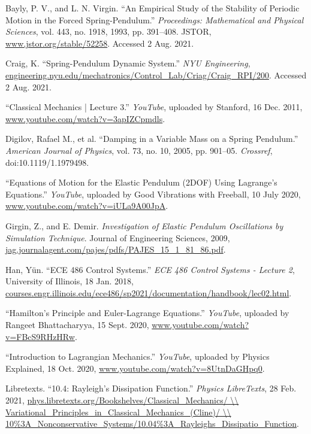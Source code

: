 

\renewcommand{\bibname}{{Bibliography}}

\begin{thebibliography}{99}

Bayly, P. V., and L. N. Virgin. “An Empirical Study of the Stability of Periodic Motion in the Forced Spring-Pendulum.” \emph{Proceedings: Mathematical and Physical Sciences}, vol. 443, no. 1918, 1993, pp. 391–408. JSTOR, \url{www.jstor.org/stable/52258}. Accessed 2 Aug. 2021.

Craig, K. “Spring-Pendulum Dynamic System.” \emph{NYU Engineering}, \url{engineering.nyu.edu/mechatronics/Control\_Lab/Criag/Craig\_RPI/200}. Accessed 2 Aug. 2021.

“Classical Mechanics | Lecture 3.” \emph{YouTube}, uploaded by Stanford, 16 Dec. 2011, \url{www.youtube.com/watch?v=3apIZCpmdls}.

Digilov, Rafael M., et al. “Damping in a Variable Mass on a Spring Pendulum.” \emph{American Journal of Physics}, vol. 73, no. 10, 2005, pp. 901–05. \emph{Crossref}, doi:10.1119/1.1979498.

“Equations of Motion for the Elastic Pendulum (2DOF) Using Lagrange’s Equations.” \emph{YouTube}, uploaded by Good Vibrations with Freeball, 10 July 2020, \url{www.youtube.com/watch?v=iULa9A00JpA}.

Girgin, Z., and E. Demir. \emph{Investigation of Elastic Pendulum Oscillations by Simulation Technique}. Journal of Engineering Sciences, 2009, \url{jag.journalagent.com/pajes/pdfs/PAJES_15_1_81_86.pdf}.

Han, Yün. “ECE 486 Control Systems.” \emph{ECE 486 Control Systems - Lecture 2}, University of Illinois, 18 Jan. 2018, \url{courses.engr.illinois.edu/ece486/sp2021/documentation/handbook/lec02.html}.

“Hamilton’s Principle and Euler-Lagrange Equations.” \emph{YouTube}, uploaded by Rangeet Bhattacharyya, 15 Sept. 2020, \url{www.youtube.com/watch?v=FBcS9RHzHRw}.

“Introduction to Lagrangian Mechanics.” \emph{YouTube}, uploaded by Physics Explained, 18 Oct. 2020, \url{www.youtube.com/watch?v=8UtnDaGHpq0}.

Libretexts. “10.4: Rayleigh’s Dissipation Function.” \emph{Physics LibreTexts}, 28 Feb. 2021, \url{phys.libretexts.org/Bookshelves/Classical\_Mechanics/ \\ Variational\_Principles\_in\_Classical\_Mechanics\_(Cline)/ \\ 10\%3A\_Nonconservative\_Systems/10.04\%3A\_Rayleighs\_Dissipatio\_Function}.


\end{thebibliography}

